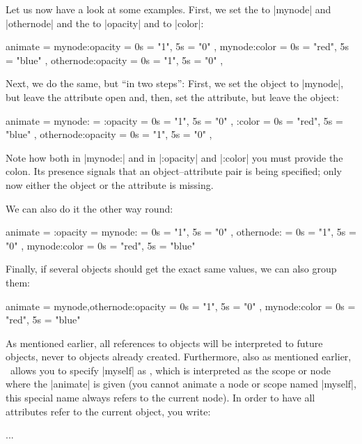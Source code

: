 Let us now have a look at some examples. First, we set the 
to |mynode| and |othernode| and the  to |opacity| and to
|color|:
%
\begin{codeexample}
animate = {
  mynode:opacity    = { 0s = "1",   5s = "0" },
  mynode:color      = { 0s = "red", 5s = "blue" },
  othernode:opacity = { 0s = "1",   5s = "0" },
}
\end{codeexample}

Next, we do the same, but ``in two steps'': First, we set the object to
|mynode|, but leave the attribute open and, then, set the attribute, but leave
the object:
%
\begin{codeexample}
animate = {
  mynode: = {
    :opacity        = { 0s = "1",   5s = "0" },
    :color          = { 0s = "red", 5s = "blue" }
  },
  othernode:opacity = { 0s = "1",   5s = "0" },
}
\end{codeexample}
%
Note how both in  |mynode:| and in |:opacity| and |:color| you must provide the
colon. Its presence signals that an object--attribute pair is being specified;
only now either the object or the attribute is missing.

We can also do it the other way round:
%
\begin{codeexample}
animate = {
  :opacity = {
    mynode:         = { 0s = "1",   5s = "0" },
    othernode:      = { 0s = "1",   5s = "0" }
  },
  mynode:color      = { 0s = "red", 5s = "blue" }
}
\end{codeexample}
%
Finally, if several objects should get the exact same values, we can also group
them:
%
\begin{codeexample}
animate = {
  {mynode,othernode}:opacity = { 0s = "1",   5s = "0" },
  mynode:color               = { 0s = "red", 5s = "blue" }
}
\end{codeexample}

As mentioned earlier, all references to objects will be interpreted to future
objects, never to objects already created. Furthermore, also as mentioned
earlier, \tikzname\ allows you to specify |myself| as , which is
interpreted as the scope or node where the |animate| is given (you cannot
animate a node or scope named |myself|, this special name always refers to the
current node). In order to have all attributes refer to the current object, you
write:
%
\begin{codeexample}
\begin{scope} [animate = {
                 myself: = { %
                   :opacity = { ... },
                   :xshift  = { ... }
                 }
               }]
  ...
\end{scope}
\end{codeexample}

